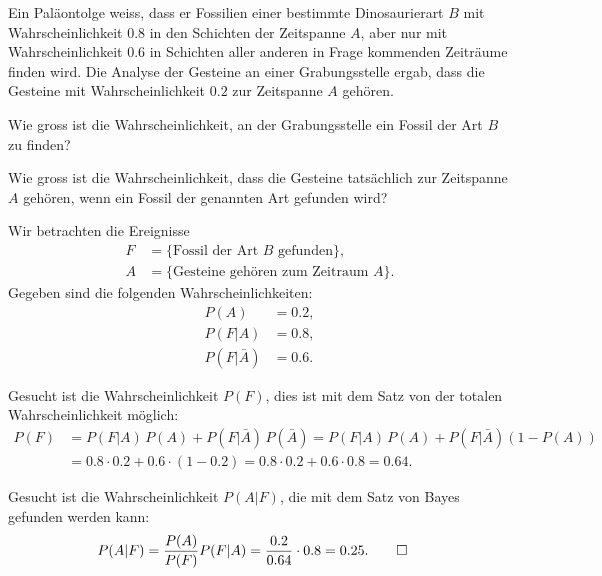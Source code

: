 Ein Paläontolge weiss, dass er Fossilien einer bestimmte Dinosaurierart $B$
mit Wahrscheinlichkeit $0.8$ in den Schichten der Zeitspanne $A$, 
aber nur mit Wahrscheinlichkeit $0.6$ in Schichten aller anderen in
Frage kommenden Zeiträume finden wird.
Die Analyse der Gesteine an einer Grabungsstelle ergab, dass die Gesteine
mit Wahrscheinlichkeit $0.2$ zur Zeitspanne $A$ gehören.
\begin{teilaufgaben}
\item
Wie gross ist die Wahrscheinlichkeit, an der Grabungsstelle ein Fossil
der Art $B$ zu finden?
\item
Wie gross ist die Wahrscheinlichkeit, dass die Gesteine tatsächlich zur
Zeitspanne $A$ gehören, wenn ein Fossil der genannten Art gefunden wird?
\end{teilaufgaben}

\begin{loesung}
Wir betrachten die Ereignisse
\begin{align*}
F&=\{\text{Fossil der Art $B$ gefunden}\},
\\
A&=\{\text{Gesteine gehören zum Zeitraum $A$}\}.
\end{align*}
Gegeben sind die folgenden Wahrscheinlichkeiten:
\begin{align*}
P(A)&=0.2,
\\
P(F|A)&=0.8,
\\
P(F|\bar A)&=0.6.
\end{align*}
\begin{teilaufgaben}
\item
Gesucht ist die Wahrscheinlichkeit $P(F)$, dies ist mit dem Satz von der
totalen Wahrscheinlichkeit möglich:
\begin{align*}
P(F)
&=
P(F|A)\,P(A) + P(F|\bar A)\,P(\bar A)
=
P(F|A)\,P(A) + P(F|\bar A)(1-P(A))
\\
&=
0.8\cdot 0.2 + 0.6\cdot (1-0.2)
=
0.8\cdot 0.2 + 0.6\cdot 0.8
=0.64.
\end{align*}
\item
Gesucht ist die Wahrscheinlichkeit $P(A|F)$, die mit dem Satz von Bayes 
gefunden werden kann:
\begin{align*}
P(A|F)
&=
\frac{P(A)}{P(F)}P(F|A)
=
\frac{0.2}{0.64}\cdot 0.8
=
0.25.
\qedhere
\end{align*}
\end{teilaufgaben}
\end{loesung}



